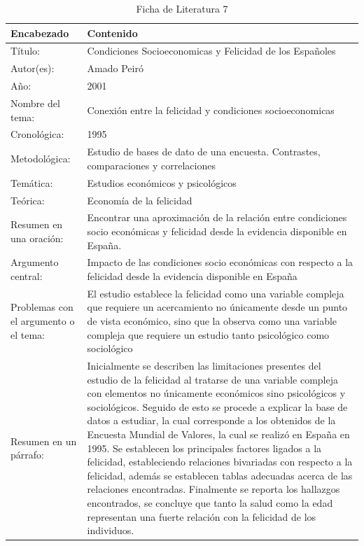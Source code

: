 \begin{table}[H]
    \caption{Ficha de Literatura 7}
    \begin{center}
        \begin{tabular}{  m{3cm} | m{12cm}  }
        \hline\textbf{ Encabezado} & \textbf{Contenido }\\ \hline
        Título: &  Condiciones Socioeconomicas y
        Felicidad de los Españoles
        \\ \hline
        Autor(es): & Amado Peiró \\ \hline
        Año: &  2001\\ \hline
        Nombre del tema: & Conexión entre la felicidad y condiciones socioeconomicas \\ \hline
        Cronológica: & 1995 \\ \hline
        Metodológica: & Estudio de bases de dato de una encuesta. Contrastes, comparaciones y correlaciones  \\ \hline
        Temática: & Estudios económicos y psicológicos\\ \hline
        Teórica:  & Economía de la felicidad \\ \hline
        Resumen en una oración: & Encontrar una aproximación de la relación entre condiciones socio económicas y felicidad desde la evidencia disponible en España. \\ \hline
        Argumento central: & Impacto de las condiciones socio económicas con respecto a la felicidad desde la evidencia disponible en España\\ \hline
        Problemas con el argumento o el tema: & El estudio establece la felicidad como una variable compleja que requiere un acercamiento no únicamente desde un punto de vista económico, sino que la observa como una variable compleja que requiere un estudio tanto psicológico como sociológico  \\ \hline
        Resumen en un párrafo: & Inicialmente se describen las limitaciones presentes del estudio de la felicidad al tratarse de una variable compleja con elementos no únicamente económicos sino psicológicos y sociológicos. Seguido de esto se procede a explicar la base de datos a estudiar, la cual corresponde a los obtenidos de la Encuesta Mundial de Valores, la cual se realizó en España en 1995. Se establecen los principales factores ligados a la felicidad, estableciendo relaciones bivariadas con respecto a la felicidad, además se establecen tablas adecuadas acerca de las relaciones encontradas. Finalmente se reporta los hallazgos encontrados, se concluye que tanto la salud como la edad representan una fuerte relación con la felicidad de los individuos. \\ \hline
        \end{tabular}
    \end{center}
\end{table}

